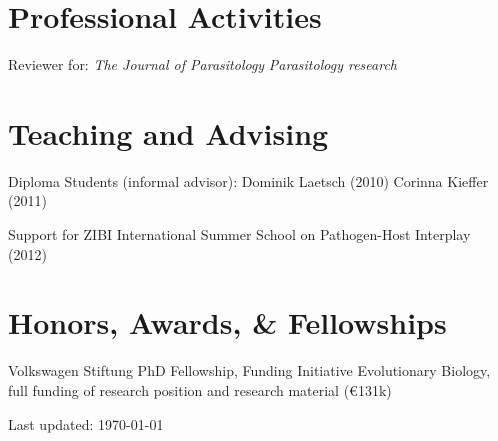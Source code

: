 \documentclass[10pt,A4paper]{article}
\renewenvironment{itemize}{
  \begin{list}{}{
    \setlength{\leftmargin}{1.5em}
    \setlength{\itemsep}{0.25em}
    \setlength{\parskip}{0pt}
    \setlength{\parsep}{0.25em}
  }
}{
  \end{list}
}
\begin{document}
\section*{Professional Activities}
\begin{itemize}
\item Reviewer for:\newline
  \textit{The Journal of Parasitology}\newline
  \textit{Parasitology research}
\end{itemize}

\section*{Teaching and Advising}
\begin{itemize}
\item Diploma Students (informal advisor):\newline
  Dominik Laetsch (2010)\newline
  Corinna Kieffer (2011)
\item Support for ZIBI International Summer School on Pathogen-Host
  Interplay (2012)
\end{itemize}

\section*{Honors, Awards, \& Fellowships}

\begin{itemize}
\item [2008] Volkswagen Stiftung PhD Fellowship, Funding Initiative
  Evolutionary Biology, full funding of research position and research
  material (\euro 131k)
\end{itemize}



\begin{center}
  \begin{small}
    Last updated: \today
  \end{small}
\end{center}
\end{document}
